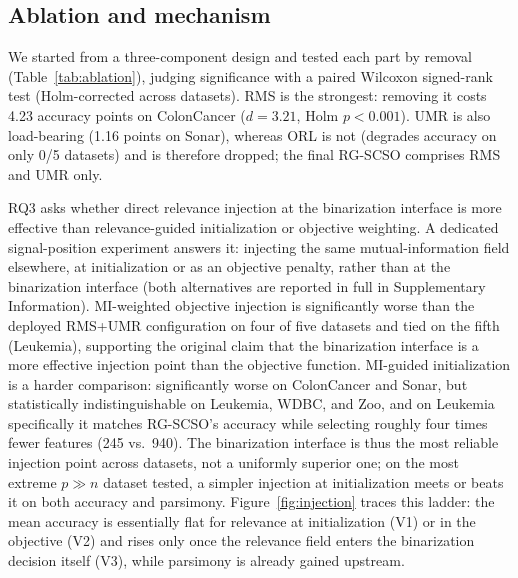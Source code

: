 \documentclass[preprint,3p,times]{elsarticle}
\begin{document}
\subsection{Ablation and mechanism}
\label{sec:ablation}
We started from a three-component design and tested each part by removal (Table~\ref{tab:ablation}), judging significance with a paired Wilcoxon signed-rank test (Holm-corrected across datasets). RMS is the strongest: removing it costs 4.23 accuracy points on ColonCancer ($d=3.21$, Holm $p<0.001$). UMR is also load-bearing (1.16 points on Sonar), whereas ORL is not (degrades accuracy on only 0/5 datasets) and is therefore dropped; the final RG-SCSO comprises RMS and UMR only.

RQ3 asks whether direct relevance injection at the binarization interface is more effective than relevance-guided initialization or objective weighting. A dedicated signal-position experiment answers it: injecting the same mutual-information field elsewhere, at initialization or as an objective penalty, rather than at the binarization interface (both alternatives are reported in full in Supplementary Information). MI-weighted objective injection is significantly worse than the deployed RMS+UMR configuration on four of five datasets and tied on the fifth (Leukemia), supporting the original claim that the binarization interface is a more effective injection point than the objective function. MI-guided initialization is a harder comparison: significantly worse on ColonCancer and Sonar, but statistically indistinguishable on Leukemia, WDBC, and Zoo, and on Leukemia specifically it matches RG-SCSO's accuracy while selecting roughly four times fewer features (245 vs.\ 940). The binarization interface is thus the most reliable injection point across datasets, not a uniformly superior one; on the most extreme $p\gg n$ dataset tested, a simpler injection at initialization meets or beats it on both accuracy and parsimony. Figure~\ref{fig:injection} traces this ladder: the mean accuracy is essentially flat for relevance at initialization (V1) or in the objective (V2) and rises only once the relevance field enters the binarization decision itself (V3), while parsimony is already gained upstream.
\end{document}

